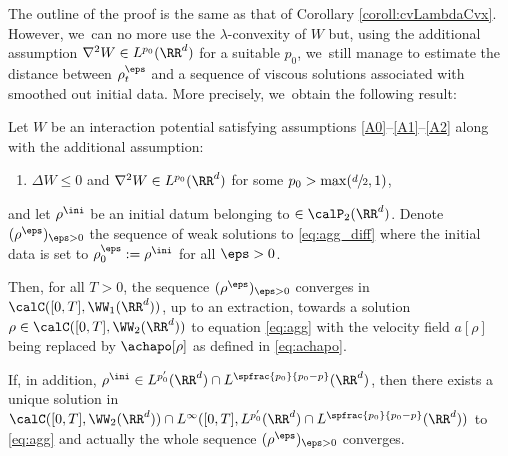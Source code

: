 The outline of the proof is the same as that of Corollary \ref{coroll:cvLambdaCvx}. However, we~can no more use the $\lambda$-convexity of $W$ but, using the additional assumption $\nabla^2 W \in L^{p_0}(\RR^d)$ for a suitable $p_0$, we~still manage to estimate the distance between $\rho_t^\eps$ and a sequence of viscous solutions associated with smoothed out initial data. More precisely, we~obtain the following result:
\begin{theorem}\label{thm:cvRepulsive}
Let $W$ be an interaction potential satisfying assumptions \eqref{A0}--\eqref{A1}--\eqref{A2} along with the additional assumption:
\begin{enumerate}\renewcommand{\theenumi}{\textup{A}\arabic{enumi}}\setcounter{enumi}{4}
\item
\label{A5} $\Delta W \leq 0$ and $\nabla^2 W \in L^{p_0}(\RR^d)$ for some $p_0 > \max(\sfrac d2, 1)$,
\end{enumerate}
and let $\rho^{\ini}$ be an initial datum belonging to $ \in \calP_2(\RR^d)$.
Denote $(\rho^\eps)_{\eps > 0}$ the sequence of weak solutions to \eqref{eq:agg_diff} where the initial data is set to $\rho_0^\eps := \rho^{\ini}$ for all $\eps > 0$.

Then, for all $T>0$, the sequence $(\rho^\eps)_{\eps > 0}$ converges in $\calC([0,T], \WW_1(\RR^d))$, up to an extraction, towards a solution $\rho \in \calC([0,T], \WW _2(\RR^d))$ to equation \eqref{eq:agg} with the velocity field $a[\rho]$ being replaced by $\achapo[\rho]$ as defined in \eqref{eq:achapo}.

If, in addition, $\rho^{\ini} \in L^{p_0'}(\RR^d) \cap L^{\spfrac{p_0}{p_0-p}}(\RR^d)$, then there exists a unique solution in $\calC([0,T], \WW_2(\RR^d)) \cap L^\infty([0,T], L^{p_0'}(\RR^d) \cap L^{\spfrac{p_0}{p_0-p}}(\RR^d))$ to \eqref{eq:agg} and actually the whole sequence $(\rho^\eps)_{\eps > 0}$ converges.
\end{theorem}

